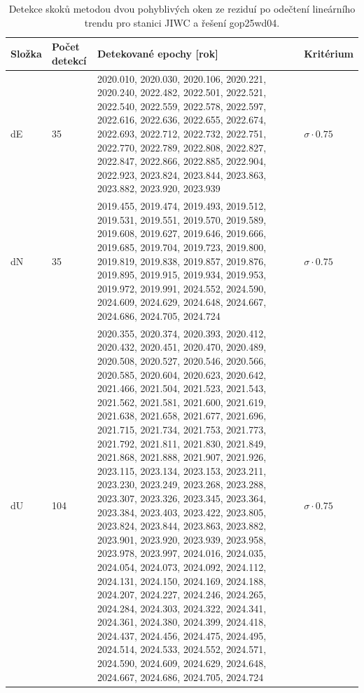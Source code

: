 \begin{table}[htbp]
\caption{Detekce skoků metodou dvou pohyblivých oken ze reziduí po odečtení lineárního trendu pro stanici JIWC a řešení gop25wd04.}
\label{tab:gop25wd04_stcd_jiwc_detr_weighted_1seg_jumps_sliding_window}
\begin{tabular}{llll}
\toprule
Složka & Počet detekcí & Detekované epochy [rok] & Kritérium \\
\midrule
dE & 35 & 2020.010, 2020.030, 2020.106, 2020.221, 2020.240, 2022.482, 2022.501, 2022.521, 2022.540, 2022.559, 2022.578, 2022.597, 2022.616, 2022.636, 2022.655, 2022.674, 2022.693, 2022.712, 2022.732, 2022.751, 2022.770, 2022.789, 2022.808, 2022.827, 2022.847, 2022.866, 2022.885, 2022.904, 2022.923, 2023.824, 2023.844, 2023.863, 2023.882, 2023.920, 2023.939 & $\sigma \cdot 0.75$ \\
dN & 35 & 2019.455, 2019.474, 2019.493, 2019.512, 2019.531, 2019.551, 2019.570, 2019.589, 2019.608, 2019.627, 2019.646, 2019.666, 2019.685, 2019.704, 2019.723, 2019.800, 2019.819, 2019.838, 2019.857, 2019.876, 2019.895, 2019.915, 2019.934, 2019.953, 2019.972, 2019.991, 2024.552, 2024.590, 2024.609, 2024.629, 2024.648, 2024.667, 2024.686, 2024.705, 2024.724 & $\sigma \cdot 0.75$ \\
dU & 104 & 2020.355, 2020.374, 2020.393, 2020.412, 2020.432, 2020.451, 2020.470, 2020.489, 2020.508, 2020.527, 2020.546, 2020.566, 2020.585, 2020.604, 2020.623, 2020.642, 2021.466, 2021.504, 2021.523, 2021.543, 2021.562, 2021.581, 2021.600, 2021.619, 2021.638, 2021.658, 2021.677, 2021.696, 2021.715, 2021.734, 2021.753, 2021.773, 2021.792, 2021.811, 2021.830, 2021.849, 2021.868, 2021.888, 2021.907, 2021.926, 2023.115, 2023.134, 2023.153, 2023.211, 2023.230, 2023.249, 2023.268, 2023.288, 2023.307, 2023.326, 2023.345, 2023.364, 2023.384, 2023.403, 2023.422, 2023.805, 2023.824, 2023.844, 2023.863, 2023.882, 2023.901, 2023.920, 2023.939, 2023.958, 2023.978, 2023.997, 2024.016, 2024.035, 2024.054, 2024.073, 2024.092, 2024.112, 2024.131, 2024.150, 2024.169, 2024.188, 2024.207, 2024.227, 2024.246, 2024.265, 2024.284, 2024.303, 2024.322, 2024.341, 2024.361, 2024.380, 2024.399, 2024.418, 2024.437, 2024.456, 2024.475, 2024.495, 2024.514, 2024.533, 2024.552, 2024.571, 2024.590, 2024.609, 2024.629, 2024.648, 2024.667, 2024.686, 2024.705, 2024.724 & $\sigma \cdot 0.75$ \\
\bottomrule
\end{tabular}
\end{table}
